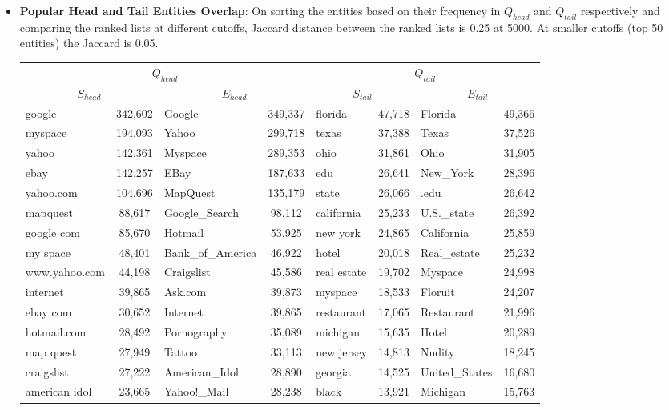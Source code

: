 \documentclass[a0,portrait,final]{a0poster}
\newcommand{\tail}[1]{$Q_{tail}${}}
\newcommand{\head}[1]{$Q_{head}${}}
\newcommand{\stail}[1]{$S_{tail}${}}
\newcommand{\shead}[1]{$S_{head}${}}
\newcommand{\etail}[1]{$E_{tail}${}}
\newcommand{\ehead}[1]{$E_{head}${}}
\begin{document}
\begin{multicols}{2}
\begin {itemize}
	\item {\textbf{Popular Head and Tail Entities Overlap}:} On sorting the entities based on their frequency in \head{} 		and \tail{} respectively and comparing the ranked lists at different cutoffs, Jaccard distance between the ranked lists is 		0.25 at 5000. At smaller cutoffs (top 50 entities) the Jaccard is 0.05. 
	
\begin{tabular}{lc|lc|lc|lc}
\toprule
\multicolumn{4}{c}{\head{}} & \multicolumn{4}{c}{\tail{}}\\
\multicolumn{2}{c}{\shead{}} & \multicolumn{2}{c}{\ehead{}} & \multicolumn{2}{c}{\stail{}} & \multicolumn{2}{c}{\etail{}}\\
\midrule
google         & 342,602  &  Google  		   & 349,337  &  florida 	 &	47,718	&	Florida 		& 49,366 \\
myspace        & 194,093  &  Yahoo\!  		   & 299,718  &  texas  	 &	 37,388  &   Texas   		& 37,526 \\
yahoo          & 142,361  &  Myspace 		   & 289,353  &  ohio    	 &	31,861   &   Ohio    		& 31,905 \\			
ebay           & 142,257  &   EBay   		   & 187,633  &  edu     	 &	26,641   &   New\_York        & 28,396 \\
yahoo.com      & 104,696  &  MapQuest          & 135,179  &  state   	 &	26,066   &   .edu    		& 26,642 \\
mapquest       & 88,617   &  Google\_Search     & 98,112   &  california  &   25,233  &   U.S.\_state      & 26,392 \\
google com     & 85,670   &  Hotmail           & 53,925   &  new york    &   24,865  &   California      & 25,859 \\
my space       & 48,401   &	  Bank\_of\_America  & 46,922   &  hotel   	 &	20,018   &   Real\_estate     & 25,232 \\
www.yahoo.com  & 44,198   &  Craigslist        & 45,586   &  real estate &   19,702  &   Myspace 		& 24,998 \\
internet       & 39,865   &  Ask.com           & 39,873   &  myspace 	 &	18,533   &   Floruit 		& 24,207 \\
ebay com       & 30,652   &  Internet          & 39,865   &  restaurant  &  17,065   &   Restaurant      & 21,996 \\
hotmail.com    & 28,492   &  Pornography       & 35,089   &  michigan    &   15,635  &   Hotel   		& 20,289 \\
map quest      & 27,949   &  Tattoo            & 33,113   &  new jersey  &   14,813  &   Nudity  		& 18,245 \\
craigslist     & 27,222   &  American\_Idol     & 28,890   &  georgia 	 &	14,525   &   United\_States   & 16,680 \\
american idol  & 23,665   &  Yahoo!\_Mail       & 28,238   &  black   	 &	13,921   &   Michigan        & 15,763 \\
\bottomrule
\end{tabular}


\end{itemize}
\end{multicols}
\end{document}
